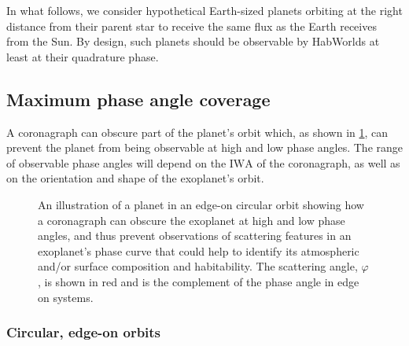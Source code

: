 \documentclass[
    usenatbib,
]{mnras}
\newcommand{\IWA}{\ensuremath{\mathrm{IWA}}}
\newcommand{\hwo}{HabWorlds}
\begin{document}
In what follows, we consider hypothetical Earth-sized planets orbiting at the right distance from their parent star to receive the same flux as the Earth receives from the Sun.
%
By design, such planets should be observable by \hwo{} at least at their quadrature phase.


\subsection{Maximum phase angle coverage}
\label{subsec:2.2}

A coronagraph can obscure part of the planet's orbit which, as shown in \cref{fig:annotated-orbit}, can prevent the planet from being observable at high and low phase angles. 
%
The range of observable phase angles will depend on the \IWA{} of the coronagraph, as well as on the orientation and shape of the exoplanet's orbit.

\begin{figure}
    \centering
    
    \caption{
        An illustration of a planet in an edge-on circular orbit showing how a coronagraph can obscure the exoplanet at high and low phase angles, and thus prevent observations of scattering features in an exoplanet's phase curve that could help to identify its atmospheric and/or surface composition and habitability. 
        The scattering angle, $\varphi$, is shown in red and is the complement of the phase angle in edge on systems.
    }
    \label{fig:annotated-orbit}
\end{figure}

\subsubsection{Circular, edge-on orbits}
\end{document}
